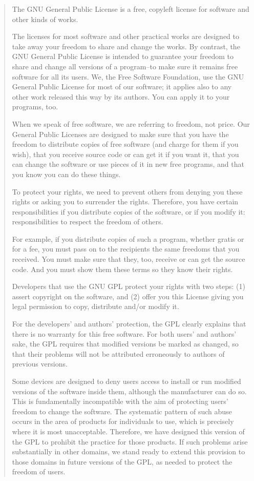\documentclass[letterpaper,10pt,english]{sphinxmanual}
\begin{document}
\label{docs/license:preamble}\begin{quote}

The GNU General Public License is a free, copyleft license for
software and other kinds of works.

The licenses for most software and other practical works are designed
to take away your freedom to share and change the works. By contrast,
the GNU General Public License is intended to guarantee your freedom to
share and change all versions of a program--to make sure it remains free
software for all its users.  We, the Free Software Foundation, use the
GNU General Public License for most of our software; it applies also to
any other work released this way by its authors.  You can apply it to
your programs, too.

When we speak of free software, we are referring to freedom, not
price.  Our General Public Licenses are designed to make sure that you
have the freedom to distribute copies of free software (and charge for
them if you wish), that you receive source code or can get it if you
want it, that you can change the software or use pieces of it in new
free programs, and that you know you can do these things.

To protect your rights, we need to prevent others from denying you
these rights or asking you to surrender the rights.  Therefore, you have
certain responsibilities if you distribute copies of the software, or if
you modify it: responsibilities to respect the freedom of others.

For example, if you distribute copies of such a program, whether
gratis or for a fee, you must pass on to the recipients the same
freedoms that you received.  You must make sure that they, too, receive
or can get the source code.  And you must show them these terms so they
know their rights.

Developers that use the GNU GPL protect your rights with two steps:
(1) assert copyright on the software, and (2) offer you this License
giving you legal permission to copy, distribute and/or modify it.

For the developers' and authors' protection, the GPL clearly explains
that there is no warranty for this free software.  For both users' and
authors' sake, the GPL requires that modified versions be marked as
changed, so that their problems will not be attributed erroneously to
authors of previous versions.

Some devices are designed to deny users access to install or run
modified versions of the software inside them, although the manufacturer
can do so.  This is fundamentally incompatible with the aim of
protecting users' freedom to change the software.  The systematic
pattern of such abuse occurs in the area of products for individuals to
use, which is precisely where it is most unacceptable.  Therefore, we
have designed this version of the GPL to prohibit the practice for those
products.  If such problems arise substantially in other domains, we
stand ready to extend this provision to those domains in future versions
of the GPL, as needed to protect the freedom of users.


\end{quote}
\end{document}
